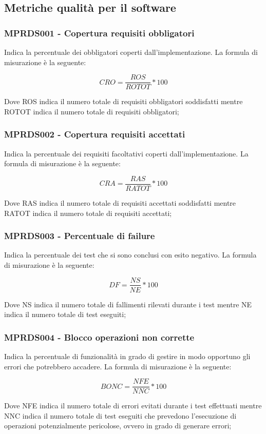 {\subsection{Metriche qualità per il software}
\label{sec:metriche_software}
\subsubsection{MPRDS001 - Copertura requisiti obbligatori}
Indica la percentuale dei  obbligatori coperti dall'implementazione. La formula di misurazione è la seguente:
\begin{center}
    \begin{displaymath}
        CRO = \frac{ROS}{ROTOT} * 100
    \end{displaymath}
\end{center}
Dove ROS indica il numero totale di requisiti obbligatori soddisfatti mentre ROTOT indica il numero totale di requisiti obbligatori;
\subsubsection{MPRDS002 - Copertura requisiti accettati}
Indica la percentuale dei requisiti facoltativi coperti dall'implementazione. La formula di misurazione è la seguente:
\begin{center}
    \begin{displaymath}
        CRA = \frac{RAS}{RATOT} * 100
    \end{displaymath}
\end{center}
Dove RAS indica il numero totale di requisiti accettati soddisfatti mentre RATOT indica il numero totale di requisiti accettati;
\subsubsection{MPRDS003 - Percentuale di failure}
Indica la percentuale dei test che si sono conclusi con esito negativo. La formula di misurazione è la seguente:
\begin{center}
    \begin{displaymath}
        DF = \frac{NS}{NE} * 100
    \end{displaymath}
\end{center}
Dove NS indica il numero totale di fallimenti rilevati durante i test mentre NE indica il numero totale di test eseguiti;
\subsubsection{MPRDS004 - Blocco operazioni non corrette}
Indica la percentuale di funzionalità in grado di gestire in modo opportuno gli errori che potrebbero accadere. La formula di misurazione è la seguente:
\begin{center}
    \begin{displaymath}
        BONC = \frac{NFE}{NNC} * 100
    \end{displaymath}
\end{center}
Dove NFE indica il numero totale di errori evitati durante i test effettuati mentre NNC indica il numero totale di test eseguiti che prevedono l'esecuzione di operazioni potenzialmente pericolose, ovvero in grado di generare errori;
}
